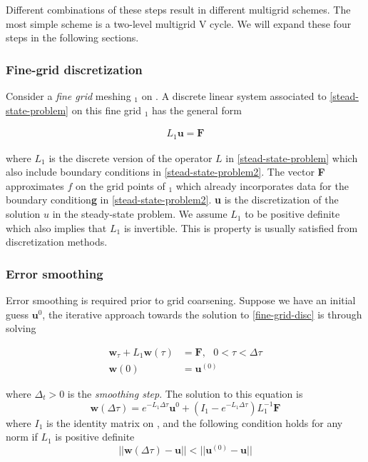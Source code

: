 Different combinations of these steps result in different multigrid schemes. The most simple scheme is a two-level multigrid V cycle. We will expand these four steps in the following sections.

\subsubsection{Fine-grid discretization}
Consider a \textit{fine grid} meshing \text{$\Omega$}$_1$ on \text{$\Omega$}. A discrete linear system associated to \autoref{stead-state-problem} on this fine grid \text{$\Omega$}$_1$ has the general form 

\begin{align}
    L_1 \mathbf{u} = \mathbf{F}
    \label{fine-grid-disc}
\end{align}

where $L_1$ is the discrete version of the operator $L$ in \autoref{stead-state-problem} which also include boundary conditions in \autoref{stead-state-problem2}. The vector \textbf{F} approximates $f$ on the grid points of \text{$\Omega$}$_1$ which already incorporates data for the boundary condition\textbf{g} in \autoref{stead-state-problem2}. \textbf{u} is the discretization of the solution $u$ in the steady-state problem. We assume $L_1$ to be positive definite which also implies that $L_1$ is invertible. This is property is usually satisfied from discretization methods. 

\subsubsection{Error smoothing}
Error smoothing is required prior to grid coarsening. Suppose we have an initial guess $\mathbf{u}^0$, the iterative approach towards the solution to \autoref{fine-grid-disc} is through solving

\begin{align}
    \mathbf{w}_\tau + L_1 \mathbf{w}(\tau) &= \mathbf{F},\text{ }  0 < \tau < \Delta\tau \label{pseudo-march} \\
    \mathbf{w}(0) &= \mathbf{u}^{(0)} 
\end{align}

where $\Delta_t > 0$ is the \textit{smoothing step}. The solution to this equation is 
\begin{equation}
    \mathbf{w}(\Delta\tau) = e^{-L_1\Delta\tau}\mathbf{u}^{0} + (I_1 - e^{-L_1\Delta\tau})L_1^{-1}\mathbf{F}
\end{equation}
where $I_1$ is the identity matrix on , and the following condition holds for any norm if $L_1$ is positive definite
\begin{equation}
    ||\mathbf{w}(\Delta\tau) - \mathbf{u}|| < ||\mathbf{u}^{(0)} - \mathbf{u}||
\end{equation}


